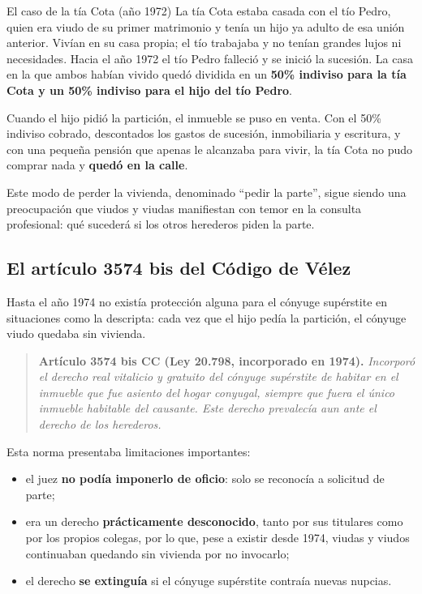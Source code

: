 \documentclass[12pt,oneside]{book}
\begin{document}
\begin{example}{El caso de la tía Cota (año 1972)}
La tía Cota estaba casada con el tío Pedro, quien era viudo de su primer matrimonio y tenía un hijo ya adulto de esa unión anterior. Vivían en su casa propia; el tío trabajaba y no tenían grandes lujos ni necesidades. Hacia el año 1972 el tío Pedro falleció y se inició la sucesión. La casa en la que ambos habían vivido quedó dividida en un \textbf{50\% indiviso para la tía Cota y un 50\% indiviso para el hijo del tío Pedro}.

Cuando el hijo pidió la partición, el inmueble se puso en venta. Con el 50\% indiviso cobrado, descontados los gastos de sucesión, inmobiliaria y escritura, y con una pequeña pensión que apenas le alcanzaba para vivir, la tía Cota no pudo comprar nada y \textbf{quedó en la calle}.
\end{example}

Este modo de perder la vivienda, denominado ``pedir la parte'', sigue siendo una preocupación que viudos y viudas manifiestan con temor en la consulta profesional: qué sucederá si los otros herederos piden la parte.

\subsection{El artículo 3574 bis del Código de Vélez}

Hasta el año 1974 no existía protección alguna para el cónyuge supérstite en situaciones como la descripta: cada vez que el hijo pedía la partición, el cónyuge viudo quedaba sin vivienda.

\begin{quote}
\textbf{Artículo 3574 bis CC (Ley 20.798, incorporado en 1974).} \textit{Incorporó el derecho real vitalicio y gratuito del cónyuge supérstite de habitar en el inmueble que fue asiento del hogar conyugal, siempre que fuera el único inmueble habitable del causante. Este derecho prevalecía aun ante el derecho de los herederos.}
\end{quote}

Esta norma presentaba limitaciones importantes:

\begin{itemize}
    \item el juez \textbf{no podía imponerlo de oficio}: solo se reconocía a solicitud de parte;
    \item era un derecho \textbf{prácticamente desconocido}, tanto por sus titulares como por los propios colegas, por lo que, pese a existir desde 1974, viudas y viudos continuaban quedando sin vivienda por no invocarlo;
    \item el derecho \textbf{se extinguía} si el cónyuge supérstite contraía nuevas nupcias.
\end{itemize}
\end{document}
